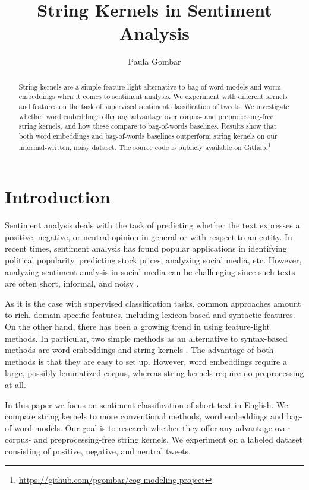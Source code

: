 \documentclass[final]{ieee}
\title[journalExample]{String Kernels in Sentiment Analysis}
\author[Lastname]{%
   Paula Gombar \\
}
\begin{document}
\maketitle

\begin{abstract}
String kernels are a simple feature-light alternative to bag-of-word-models and worm embeddings when it comes to sentiment analysis. We experiment with different kernels and features on the task of supervised sentiment classification of tweets. We investigate whether word embeddings offer any advantage over corpus- and preprocessing-free string kernels, and how these compare to bag-of-words baselines. Results show that both word embeddings and bag-of-words baselines outperform string kernels on our informal-written, noisy dataset. The source code is publicly available on Github.\footnote{\url{https://github.com/pgombar/cog-modeling-project}}
\end{abstract}

\section{Introduction}\label{sec:intro}
Sentiment analysis \citep{pang2008opinion} deals with the task of predicting whether the text expresses a positive, negative, or neutral opinion in general or with respect to an entity. In recent times, sentiment analysis has found popular applications in identifying political popularity, predicting stock prices, analyzing social media, etc. However, analyzing sentiment analysis in social media can be challenging since such texts are often short, informal, and noisy \citep{baldwin2013noisy}.

As it is the case with supervised classification tasks, common approaches amount to rich, domain-specific features, including lexicon-based and syntactic features. On the other hand, there has been a growing trend in using feature-light methods. In particular, two simple methods as an alternative to syntax-based methods are word embeddings \citep{mikolov2013distributed} and string kernels \citep{lodhi2002text}. The advantage of both methods is that they are easy to set up. However, word embeddings require a large, possibly lemmatized corpus, whereas string kernels require no preprocessing at all.

In this paper we focus on sentiment classification of short text in English. We compare string kernels to more conventional methods, word embeddings and bag-of-word-models. Our goal is to research whether they offer any advantage over corpus- and preprocessing-free string kernels. We experiment on a labeled dataset consisting of positive, negative, and neutral tweets.
            
\end{document}
